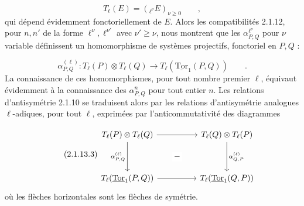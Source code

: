 \begin{equation}\tag{2.1.13.1}
T_\ell(E) = ({}_{\ell^\nu}E)_{\nu \geq 0} \qquad ,
\end{equation}
qui dépend évidemment fonctoriellement de $E$. Alors les compatibilités 2.1.12, pour $n,n'$ de la forme $\ell^\nu,\ell^{\nu'}$ avec $\nu' \geq \nu$, nous montrent que les $\alpha^{\ell^\nu}_{P,Q}$ pour $\nu$ variable définissent un homomorphisme de systèmes projectifs, fonctoriel en $P,Q$ :

\begin{equation}\tag{2.1.13.2}
\alpha^{(\ell)}_{P,Q} : T_\ell(P) \otimes T_\ell(Q) \longrightarrow T_\ell(\underline{\mathrm{Tor}}_1(P,Q)) \qquad .
\end{equation}
La connaissance de ces homomorphismes, pour tout nombre premier $\ell$, équivaut évidemment à la connaissance des $\alpha^n_{P,Q}$ pour tout entier $n$. Les relations d'antisymétrie 2.1.10 se traduisent alors par les relations d'antisymétrie analogues $\ell$-adiques, pour tout $\ell$, exprimées par l'anticommutativité des diagrammes

\begin{equation}\tag{2.1.13.3}
\begin{tikzcd}[column sep=huge, row sep=huge]
T_\ell(P) \otimes T_\ell(Q) \arrow[r] \arrow[d, "{\alpha^{(\ell)}_{P,Q}}"'] \arrow[rd, phantom, "-" description] & T_\ell(Q) \otimes T_\ell(P) \arrow[d, "{\alpha^{(\ell)}_{Q,P}}"] \\
T_\ell(\underline{\mathrm{Tor}}_1(P,Q)) \arrow[r] & T_\ell(\underline{\mathrm{Tor}}_1(Q,P))
\end{tikzcd}
\end{equation}
où les flèches horizontales sont les flèches de symétrie.

